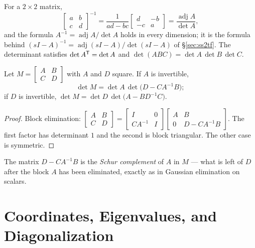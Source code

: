 \documentclass[11pt]{article}
\begin{document}
For a $2\times2$ matrix,
\[
   \begin{bmatrix}a&b\\c&d\end{bmatrix}^{-1}
   = \frac{1}{ad-bc}\begin{bmatrix}d&-b\\-c&a\end{bmatrix}
   = \frac{\operatorname{adj}A}{\det A},
\]
and the formula $A^{-1}=\operatorname{adj}A/\det A$ holds in every dimension; it is
the formula behind $(sI-A)^{-1}=\operatorname{adj}(sI-A)/\det(sI-A)$ of
\S\ref{sec:ss2tf}. The determinant satisfies $\det A^{\mathsf{T}}=\det A$ and
$\det(ABC)=\det A\,\det B\,\det C$.

\begin{proposition}\label{prop:schur}
Let $M=\begin{bmatrix}A&B\\C&D\end{bmatrix}$ with $A$ and $D$ square. If $A$ is
invertible,
\[
   \det M = \det A\,\det\bigl(D-CA^{-1}B\bigr);
\]
if $D$ is invertible, $\det M=\det D\,\det\bigl(A-BD^{-1}C\bigr)$.
\end{proposition}
\begin{proof}
Block elimination: $\begin{bmatrix}A&B\\C&D\end{bmatrix}
=\begin{bmatrix}I&0\\CA^{-1}&I\end{bmatrix}
\begin{bmatrix}A&B\\0&D-CA^{-1}B\end{bmatrix}$. The first factor has determinant
$1$ and the second is block triangular. The other case is symmetric.
\end{proof}
The matrix $D-CA^{-1}B$ is the \emph{Schur complement} of $A$ in $M$ --- what is
left of $D$ after the block $A$ has been eliminated, exactly as in Gaussian
elimination on scalars.

\section{Coordinates, Eigenvalues, and Diagonalization}\label{sec:eigen}
\end{document}
